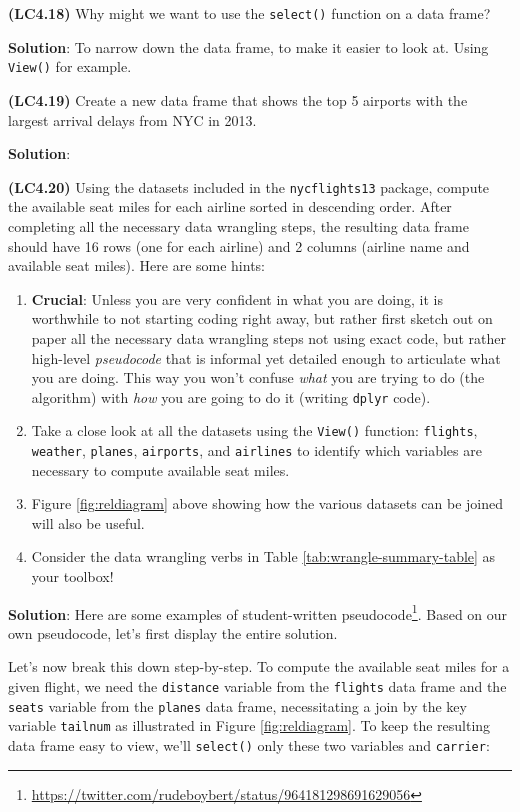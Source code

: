 \documentclass[12pt, krantz2,]{krantz}
\providecommand{\tightlist}{%
  \setlength{\itemsep}{0pt}\setlength{\parskip}{0pt}}
\renewcommand{\href}[2]{#2\footnote{\url{#1}}}
\begin{document}
\textbf{(LC4.18)} Why might we want to use the \texttt{select()} function on a data frame?

\textbf{Solution}: To narrow down the data frame, to make it easier to look at. Using \texttt{View()} for example.

\textbf{(LC4.19)} Create a new data frame that shows the top 5 airports with the largest arrival delays from NYC in 2013.

\textbf{Solution}:

\textbf{(LC4.20)} Using the datasets included in the \texttt{nycflights13} package, compute the available seat miles for each airline sorted in descending order. After completing all the necessary data wrangling steps, the resulting data frame should have 16 rows (one for each airline) and 2 columns (airline name and available seat miles). Here are some hints:

\begin{enumerate}
\def\labelenumi{\arabic{enumi}.}
\tightlist
\item
  \textbf{Crucial}: Unless you are very confident in what you are doing, it is worthwhile to not starting coding right away, but rather first sketch out on paper all the necessary data wrangling steps not using exact code, but rather high-level \emph{pseudocode} that is informal yet detailed enough to articulate what you are doing. This way you won't confuse \emph{what} you are trying to do (the algorithm) with \emph{how} you are going to do it (writing \texttt{dplyr} code).
\item
  Take a close look at all the datasets using the \texttt{View()} function: \texttt{flights}, \texttt{weather}, \texttt{planes}, \texttt{airports}, and \texttt{airlines} to identify which variables are necessary to compute available seat miles.
\item
  Figure \ref{fig:reldiagram} above showing how the various datasets can be joined will also be useful.
\item
  Consider the data wrangling verbs in Table \ref{tab:wrangle-summary-table} as your toolbox!
\end{enumerate}

\textbf{Solution}: Here are some examples of student-written \href{https://twitter.com/rudeboybert/status/964181298691629056}{pseudocode}. Based on our own pseudocode, let's first display the entire solution.

Let's now break this down step-by-step. To compute the available seat miles for a given flight, we need the \texttt{distance} variable from the \texttt{flights} data frame and the \texttt{seats} variable from the \texttt{planes} data frame, necessitating a join by the key variable \texttt{tailnum} as illustrated in Figure \ref{fig:reldiagram}. To keep the resulting data frame easy to view, we'll \texttt{select()} only these two variables and \texttt{carrier}:
\end{document}
